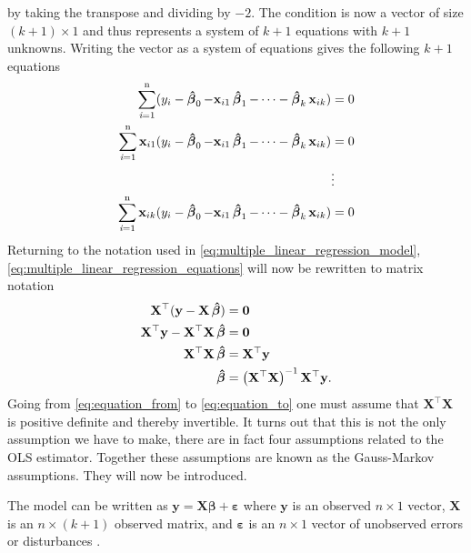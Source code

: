 by taking the transpose and dividing by $-2$.
The condition is now a vector of size $(k + 1) \times 1$ and thus represents a system of $k + 1$ equations with $k + 1$ unknowns.
Writing the vector as a system of equations gives the following $k + 1$ equations
\begin{align}\label{eq:multiple_linear_regression_equations}
\begin{split}
    \operatorname{\sum_{\textit{i}=1}^n} (y_i - \operatorname{\boldsymbol{\hat{\beta}}}_0 -  \mathbf{x}_{i1} \operatorname{\boldsymbol{\hat{\beta}}}_1 - \cdots - \operatorname{\boldsymbol{\hat{\beta}}}_k \mathbf{x}_{ik}) &= 0 \\
    \operatorname{\sum_{\textit{i}=1}^n} \mathbf{x}_{i1}(y_i - \operatorname{\boldsymbol{\hat{\beta}}}_0 -  \mathbf{x}_{i1} \operatorname{\boldsymbol{\hat{\beta}}}_1 - \cdots - \operatorname{\boldsymbol{\hat{\beta}}}_k \mathbf{x}_{ik}) &= 0 \\
    &\vdots \\
    \operatorname{\sum_{\textit{i}=1}^n} \mathbf{x}_{ik}(y_i - \operatorname{\boldsymbol{\hat{\beta}}}_0 -  \mathbf{x}_{i1} \operatorname{\boldsymbol{\hat{\beta}}}_1 - \cdots - \operatorname{\boldsymbol{\hat{\beta}}}_k \mathbf{x}_{ik}) &= 0
\end{split}
\end{align}
Returning to the notation used in \eqref{eq:multiple_linear_regression_model}, \eqref{eq:multiple_linear_regression_equations} will now be rewritten to matrix notation
\begin{align}
    \mathbf{X}^\top(\mathbf{y} - \mathbf{X}\operatorname{\boldsymbol{\hat{\beta}}}) &= \mathbf{0} \nonumber\\
    \mathbf{X}^\top\mathbf{y} - \mathbf{X}^\top\mathbf{X}\operatorname{\boldsymbol{\hat{\beta}}} &= \mathbf{0}\nonumber\\
    \mathbf{X}^\top\mathbf{X}\operatorname{\boldsymbol{\hat{\beta}}} &= \mathbf{X}^\top\mathbf{y}\label{eq:equation_from} \\
    \operatorname{\boldsymbol{\hat{\beta}}} &= \left(\mathbf{X}^\top\mathbf{X}\right)^{-1}\mathbf{X}^\top\mathbf{y}.\label{eq:equation_to}
\end{align}
Going from \eqref{eq:equation_from} to \eqref{eq:equation_to} one must assume that $\mathbf{X}^\top\mathbf{X}$ is positive definite and thereby invertible.
It turns out that this is not the only assumption we have to make, there are in fact four assumptions related to the OLS estimator.
Together these assumptions are known as the Gauss-Markov assumptions. 
They will now be introduced.
\begin{assumption}\label{as:linear_in_the_parameters}
    The model can be written as $\mathbf{y} = \mathbf{X}\boldsymbol{\beta} + \boldsymbol{\varepsilon}$ where $\mathbf{y}$ is an observed $n \times 1$ vector, $\mathbf{X}$ is an $n \times (k + 1)$ observed matrix, and $\boldsymbol{\varepsilon}$ is an $n \times 1$ vector of unobserved errors or disturbances \cite[p. 809]{Wooldridge2012}.
\end{assumption}

